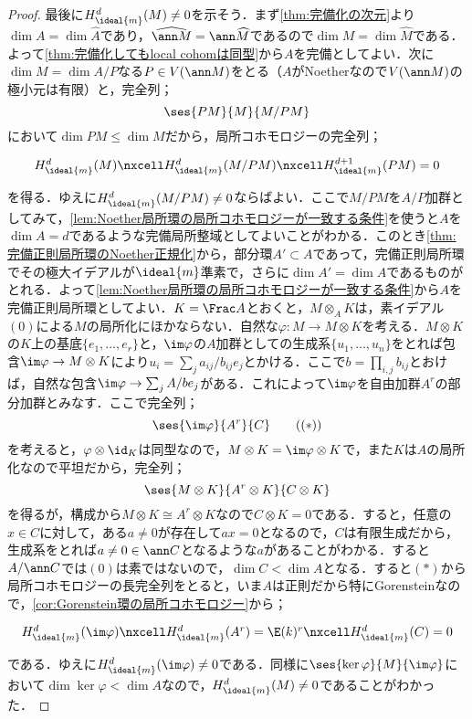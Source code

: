 \begin{proof}
	最後に$H^d_{\ideal{m}}(M)\neq 0$を示そう．まず\ref{thm:完備化の次元}より$\dim A=\dim\widehat{A}$であり，$\widehat{\ann M}=\ann\widehat{M}$であるので$\dim M=\dim\widehat{M}$である．よって\ref{thm:完備化してもlocal cohomは同型}から$A$を完備としてよい．次に$\dim M=\dim A/P$なる$P\in V(\ann M)$をとる（$A$がNoetherなので$V(\ann M)$の極小元は有限）と，完全列；
	\[\ses{PM}{M}{M/PM}\]
	において$\dim PM\leq \dim M$だから，局所コホモロジーの完全列；
	\[\begin{tikzcd}
		H^d_{\ideal{m}}(M)\nxcell H^d_{\ideal{m}}(M/PM)\nxcell H^{d+1}_{\ideal{m}}(PM)=0
	\end{tikzcd}\]
	を得る．ゆえに$H^d_{\ideal{m}}(M/PM)\neq 0$ならばよい．ここで$M/PM$を$A/P$加群としてみて，\ref{lem:Noether局所環の局所コホモロジーが一致する条件}を使うと$A$を$\dim A=d$であるような完備局所整域としてよいことがわかる．このとき\ref{thm:完備正則局所環のNoether正規化}から，部分環$A'\subset A$であって，完備正則局所環でその極大イデアルが$\ideal{m}$準素で，さらに$\dim A'=\dim A$であるものがとれる．よって\ref{lem:Noether局所環の局所コホモロジーが一致する条件}から$A$を完備正則局所環としてよい．$K=\Frac A$とおくと，$M\otimes_A K$は，素イデアル$(0)$による$M$の局所化にほかならない．自然な$\varphi:M\to M\otimes K$を考える．$M\otimes K$の$K$上の基底$\{e_1,\dots,e_r\}$と，$\im\varphi$の$A$加群としての生成系$\{u_1,\dots,u_n\}$をとれば包含$\im\varphi\to M\otimes K$により$u_i=\sum_{j} a_{ij}/b_{ij}e_j$とかける．ここで$b=\prod_{i,j}b_{ij}$とおけば，自然な包含$\im\varphi\to \sum_{j}A/be_j$がある．これによって$\im\varphi$を自由加群$A^r$の部分加群とみなす．ここで完全列；
	\[\ses{\im\varphi}{A^r}{C}\tag{$(\ast$)}\]
	を考えると，$\varphi\otimes\id_K$は同型なので，$M\otimes K=\im\varphi\otimes K$で，また$K$は$A$の局所化なので平坦だから，完全列；
	\[\ses{M\otimes K}{A^r\otimes K}{C\otimes K}\]
	を得るが，構成から$M\otimes K\cong A^r\otimes K$なので$C\otimes K=0$である．すると，任意の$x\in C$に対して，ある$a\neq 0$が存在して$ax=0$となるので，$C$は有限生成だから，生成系をとれば$a\neq 0\in \ann C$となるような$a$があることがわかる．すると$A/\ann C$では$(0)$は素ではないので，$\dim C<\dim A$となる．すると$(\ast)$から局所コホモロジーの長完全列をとると，いま$A$は正則だから特にGorensteinなので，\ref{cor:Gorenstein環の局所コホモロジー}から；
	\[\begin{tikzcd}
		H^d_{\ideal{m}}(\im\varphi)\nxcell H^d_{\ideal{m}}(A^r)=\E(k)^r\nxcell H^d_{\ideal{m}}(C)=0
	\end{tikzcd}\]
	である．ゆえに$H^d_{\ideal{m}}(\im\varphi)\neq 0$である．同様に$\ses{\ker\varphi}{M}{\im\varphi}$において$\dim\ker\varphi<\dim A$なので，$H^d_{\ideal{m}}(M)\neq 0$であることがわかった．
\end{proof}
 